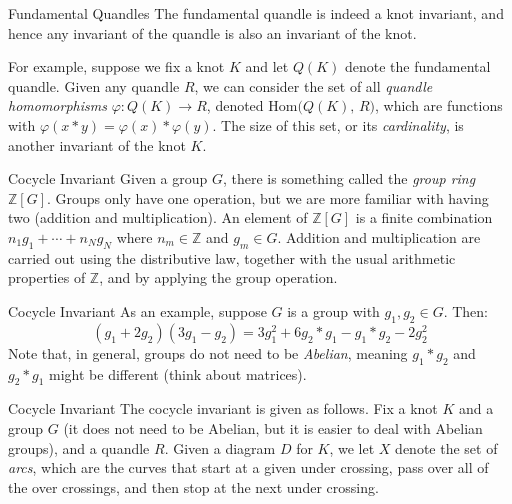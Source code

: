 \documentclass{beamer}
\begin{document}
    \begin{frame}{Fundamental Quandles}
        The fundamental quandle is indeed a knot invariant, and hence any
        invariant of the quandle is also an invariant of the knot.
        \par\hfill\par
        For example, suppose we fix a knot $K$ and let $Q(K)$ denote the
        fundamental quandle. Given any quandle $R$, we can consider the
        set of all \textit{quandle homomorphisms}
        $\varphi:Q(K)\rightarrow{R}$, denoted $\textrm{Hom}\big(Q(K),\,R\big)$,
        which are functions with
        $\varphi(x*y)=\varphi(x)*\varphi(y)$. The size of this set, or its
        \textit{cardinality}, is another invariant of the knot $K$.
    \end{frame}
    \begin{frame}{Cocycle Invariant}
        Given a group $G$, there is something called the
        \textit{group ring} $\mathbb{Z}[G]$. Groups only have one operation,
        but we are more familiar with having two (addition and multiplication).
        An element of $\mathbb{Z}[G]$ is a finite combination
        $n_{1}g_{1}+\cdots+n_{N}g_{N}$ where $n_{m}\in\mathbb{Z}$ and
        $g_{m}\in{G}$. Addition and multiplication are carried out using
        the distributive law, together with the usual arithmetic properties
        of $\mathbb{Z}$, and by applying the group operation.
    \end{frame}
    \begin{frame}{Cocycle Invariant}
        As an example, suppose $G$ is a group with
        $g_{1},g_{2}\in{G}$. Then:
        \begin{equation}
            (g_{1}+2g_{2})(3g_{1}-g_{2})
            =3g_{1}^{2}+6g_{2}*g_{1}-g_{1}*g_{2}-2g_{2}^{2}
        \end{equation}
        Note that, in general, groups do not need to be \textit{Abelian},
        meaning $g_{1}*g_{2}$ and $g_{2}*g_{1}$ might be different
        (think about matrices).
    \end{frame}
    \begin{frame}{Cocycle Invariant}
        The cocycle invariant is given as follows. Fix a knot $K$ and a group
        $G$ (it does not need to be Abelian, but it is easier to deal with
        Abelian groups), and a quandle $R$. Given a diagram $D$ for $K$, we let
        $X$ denote the set of \textit{arcs}, which are the curves that
        start at a given under crossing, pass over all of the over crossings,
        and then stop at the next under crossing.
    \end{frame}
\end{document}
